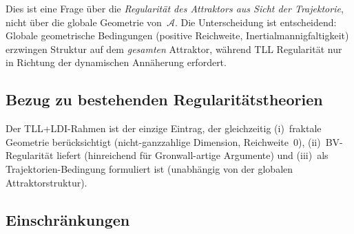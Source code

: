\documentclass[12pt,a4paper]{article}
\theoremstyle{definition}
\theoremstyle{plain}
\theoremstyle{remark}
\begin{document}
\noindent
Dies ist eine Frage über die \emph{Regularität des Attraktors
aus Sicht der Trajektorie}, nicht über die globale Geometrie
von~$\mathcal{A}$.  Die Unterscheidung ist entscheidend: Globale
geometrische Bedingungen (positive Reichweite, Inertialmannigfaltigkeit)
erzwingen Struktur auf dem \emph{gesamten} Attraktor, während TLL
Regularität nur in Richtung der dynamischen Annäherung erfordert.

\subsection{Bezug zu bestehenden Regularitätstheorien}

\begin{center}
\end{center}

\noindent
Der TLL+LDI-Rahmen ist der einzige Eintrag, der gleichzeitig
(i)~fraktale Geometrie berücksichtigt (nicht-ganzzahlige Dimension,
Reichweite~$0$), (ii)~BV-Regularität liefert (hinreichend für
Gronwall-artige Argumente) und (iii)~als Trajektorien-Bedingung
formuliert ist (unabhängig von der globalen Attraktorstruktur).

\subsection{Einschränkungen}
\end{document}

